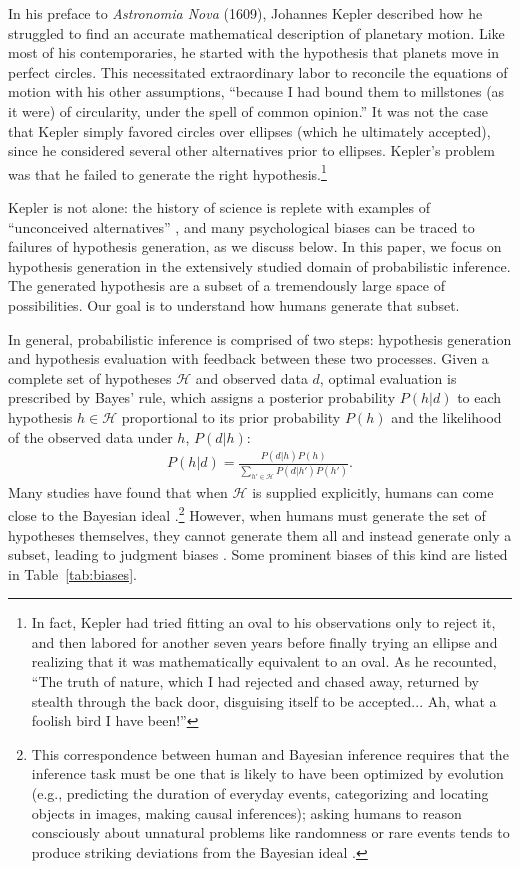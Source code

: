 In his preface to \emph{Astronomia Nova} (1609), Johannes Kepler described how he struggled to find an accurate mathematical description of planetary motion. Like most of his contemporaries, he started with the hypothesis that planets move in perfect circles. This necessitated extraordinary labor to reconcile the equations of motion with his other assumptions, ``because I had bound them to millstones (as it were) of circularity, under the spell of common opinion.'' It was not the case that Kepler simply favored circles over ellipses (which he ultimately accepted), since he considered several other alternatives prior to ellipses. Kepler's problem was that he failed to generate the right hypothesis.\footnote{In fact, Kepler had tried fitting an oval to his observations only to reject it, and then labored for another seven years before finally trying an ellipse and realizing that it was mathematically equivalent to an oval. As he recounted, ``The truth of nature, which I had rejected and chased away, returned by stealth through the back door, disguising itself to be accepted... Ah, what a foolish bird I have been!''} 

Kepler is not alone: the history of science is replete with examples of ``unconceived alternatives'' \citep{stanford10}, and many psychological biases can be traced to failures of hypothesis generation, as we discuss below. In this paper, we focus on hypothesis generation in the extensively studied domain of probabilistic inference. The generated hypothesis are a subset of a tremendously large space of possibilities. Our goal is to understand how humans generate that subset.

In general, probabilistic inference is comprised of two steps: hypothesis generation and hypothesis evaluation with feedback between these two processes. Given a complete set of hypotheses $\mathcal{H}$ and observed data $d$, optimal evaluation is prescribed by Bayes' rule, which assigns a posterior probability $P(h|d)$ to each hypothesis $h \in \mathcal{H}$ proportional to its prior probability $P(h)$ and the likelihood of the observed data under $h$, $P(d|h)$:
\begin{align}
P(h|d) = \frac{P(d|h) P(h)}{\sum_{h' \in \mathcal{H}} P(d|h') P(h')}.
\end{align}
Many studies have found that when $\mathcal{H}$ is supplied explicitly, humans can come close to the Bayesian ideal \citep[e.g.,][]{griffiths2006,griffiths2011,frank2012,petzschner2015,oaksford2007}.\footnote{This correspondence between human and Bayesian inference requires that the inference task must be one that is likely to have been optimized by evolution (e.g., predicting the duration of everyday events, categorizing and locating objects in images, making causal inferences); asking humans to reason consciously about unnatural problems like randomness or rare events tends to produce striking deviations from the Bayesian ideal \citep[see][for discussion]{chater2006}.} However, when humans must generate the set of hypotheses themselves, they cannot generate them all and instead generate only a subset, leading to judgment biases \citep{Thomas2008,Dougherty2003,carroll2015,koriat1980,weber1993,Gettys1979}. Some prominent biases of this kind are listed in Table~\ref{tab:biases}.

